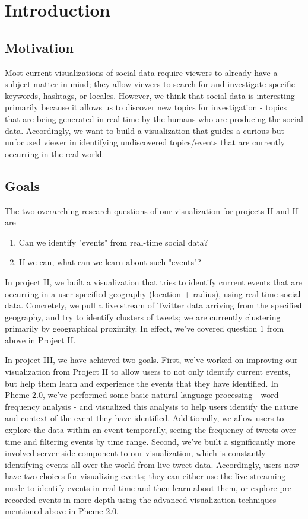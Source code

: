 \documentclass[pdftex,12pt,a4paper]{article}
\begin{document}

\tableofcontents
\pagebreak

\section{Introduction}
\subsection{Motivation}
Most current visualizations of social data require viewers to already have a subject matter in mind; they allow viewers to search for and investigate specific keywords, hashtags, or locales. However, we think that social data is interesting primarily because it allows us to discover new topics for investigation - topics that are being generated in real time by the humans who are producing the social data. Accordingly, we want to build a visualization that guides a curious but unfocused viewer in identifying undiscovered topics/events that are currently occurring in the real world.

\subsection{Goals}
The two overarching research questions of our visualization for projects II and II are
\begin{enumerate}
\item Can we identify "events" from real-time social data?
\item If we can, what can we learn about such "events"?
\end{enumerate}
In project II, we built a visualization that tries to identify current events that are occurring in a user-specified geography (location + radius), using real time social data. Concretely, we pull a live stream of Twitter data arriving from the specified geography, and try to identify clusters of tweets; we are currently clustering primarily by geographical proximity. In effect, we've covered question $1$ from above in Project II.

In project III, we have achieved two goals. First, we've worked on improving our visualization from Project II to allow users to not only identify current events, but help them learn and experience the events that they have identified. In Pheme 2.0, we've performed some basic natural language processing - word frequency analysis - and visualized this analysis to help users identify the nature and context of the event they have identified. Additionally, we allow users to explore the data within an event temporally, seeing the frequency of tweets over time and filtering events by time range. Second, we've built a significantly more involved server-side component to our visualization, which is constantly identifying events all over the world from live tweet data. Accordingly, users now have two choices for visualizing events; they can either use the live-streaming mode to identify events in real time and then learn about them, or explore pre-recorded events in more depth using the advanced visualization techniques mentioned above in Pheme 2.0.
\end{document}

